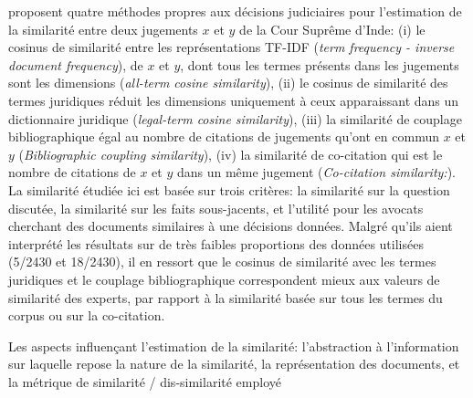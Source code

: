 \citet{kumar2011judgmentsimilarity} proposent quatre méthodes propres aux décisions judiciaires pour l'estimation de la similarité entre deux jugements  $x$ et $y$ de la Cour Suprême d'Inde: (i) le cosinus de similarité entre les représentations TF-IDF (\textit{term frequency - inverse document frequency}), de $x$ et $y$, dont tous les termes présents dans les jugements sont les dimensions (\textit{all-term cosine similarity}), (ii) le cosinus de similarité des termes juridiques réduit les dimensions uniquement à ceux apparaissant dans un dictionnaire juridique (\textit{legal-term cosine similarity}), (iii) la similarité de couplage bibliographique égal au nombre de citations de jugements qu'ont en commun $x$ et $y$ (\textit{Bibliographic coupling similarity}), (iv) la similarité de co-citation qui est le nombre de citations de $x$ et $y$ dans un même jugement (\textit{Co-citation similarity:}). La similarité étudiée ici est basée sur trois critères: la similarité sur la question discutée, la similarité sur les faits sous-jacents, et l'utilité pour les avocats cherchant des documents similaires à une décisions données. Malgré qu'ils aient interprété les résultats sur de très faibles proportions des données utilisées (5/2430 et 18/2430), il en ressort que le cosinus de similarité avec les termes juridiques et le couplage bibliographique correspondent mieux aux valeurs de similarité des experts, par rapport à la similarité basée sur tous les termes du corpus ou sur la co-citation. 

\cite{kumar2011judgmentsimilarity, nair2018judgsimassorule, branting2017autoJudiDocAnalysis}

Les aspects influençant l'estimation de la similarité: l'abstraction à l'information sur laquelle repose la nature de la similarité, la représentation des documents, et la métrique de similarité / dis-similarité employé

